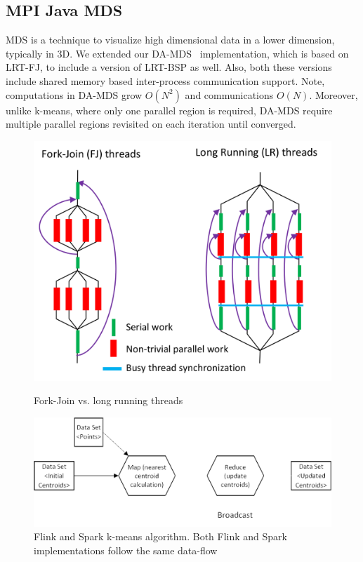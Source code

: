 \documentclass[10pt, conference, compsocconf]{IEEEtran}
\begin{document}
\subsection{MPI Java \ac{MDS}}
\ac{MDS} is a technique to visualize high dimensional data in a lower dimension, typically in 3D. We extended our \ac{DA-MDS}~\cite{hpc2016:spidaljava} implementation, which is based on \ac{LRT-FJ}, to include a version of \ac{LRT-BSP} as well. Also, both these versions include shared memory based inter-process communication support. Note, computations in \ac{DA-MDS} grow $O(N^2)$ and communications $O(N)$. Moreover, unlike k-means, where only one parallel region is required, \ac{DA-MDS} require multiple parallel regions revisited on each iteration until converged.


\begin{figure}[!htb]
    \centering
    \begin{minipage}{.49\textwidth}
        \centering        
        \includegraphics[width=0.8\columnwidth]{images/fig_fj_vs_lrt}
        \caption{Fork-Join vs. long running threads}
        \label{fig:fig_fj_vs_lrt}
    \end{minipage}
    \hspace{1.4mm}
    \begin{minipage}{0.49\textwidth}
        \centering
        \includegraphics[width=1\columnwidth]{images/fig_kmeans_dataflow}
        \caption{Flink and Spark k-means algorithm. Both Flink and Spark implementations follow the same data-flow}
        \label{fig:fig_flink_kmeans}
    \end{minipage}   
\end{figure}
\end{document}
